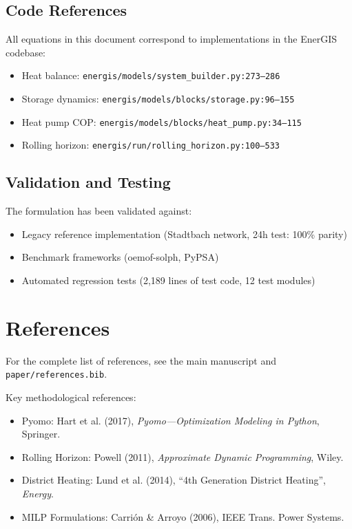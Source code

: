 \documentclass[11pt]{article}
\begin{document}
\subsection{Code References}

All equations in this document correspond to implementations in the EnerGIS codebase:

\begin{itemize}
\item Heat balance: \texttt{energis/models/system\_builder.py:273--286}
\item Storage dynamics: \texttt{energis/models/blocks/storage.py:96--155}
\item Heat pump COP: \texttt{energis/models/blocks/heat\_pump.py:34--115}
\item Rolling horizon: \texttt{energis/run/rolling\_horizon.py:100--533}
\end{itemize}

\subsection{Validation and Testing}

The formulation has been validated against:
\begin{itemize}
\item Legacy reference implementation (Stadtbach network, 24h test: 100\% parity)
\item Benchmark frameworks (oemof-solph, PyPSA)
\item Automated regression tests (2,189 lines of test code, 12 test modules)
\end{itemize}

\section{References}

For the complete list of references, see the main manuscript and \texttt{paper/references.bib}.

Key methodological references:
\begin{itemize}
\item Pyomo: Hart et al. (2017), \textit{Pyomo---Optimization Modeling in Python}, Springer.
\item Rolling Horizon: Powell (2011), \textit{Approximate Dynamic Programming}, Wiley.
\item District Heating: Lund et al. (2014), ``4th Generation District Heating'', \textit{Energy}.
\item MILP Formulations: Carrión \& Arroyo (2006), IEEE Trans. Power Systems.
\end{itemize}
\end{document}
